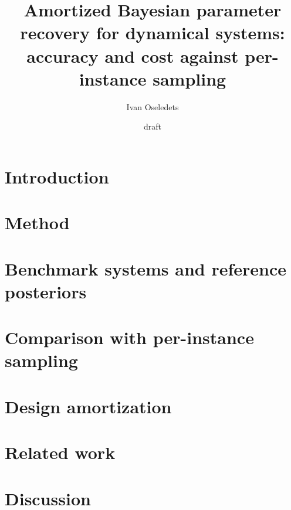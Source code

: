 \documentclass[10pt]{article}
\title{\textbf{Amortized Bayesian parameter recovery for dynamical systems:\\
accuracy and cost against per-instance sampling}}
\author{Ivan Oseledets}
\date{draft}
\begin{document}
\maketitle

\begin{abstract}
\end{abstract}

\section{Introduction}

\section{Method}

\section{Benchmark systems and reference posteriors}

\section{Comparison with per-instance sampling}

\section{Design amortization}

\section{Related work}

\section{Discussion}


% 
\end{document}
